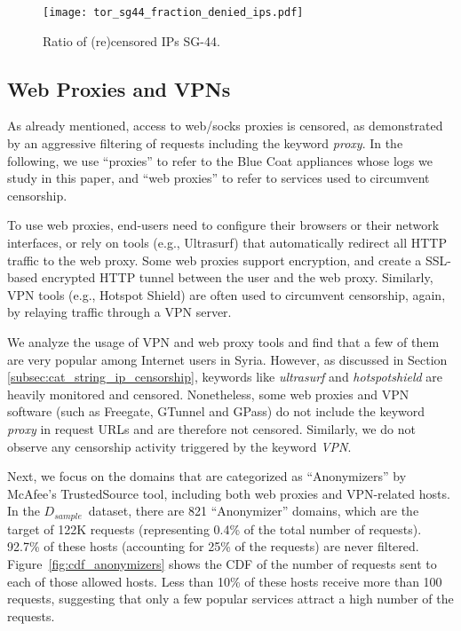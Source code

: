 \documentclass{sig-alternate-2013}
\def\ds{$D_{sample}$\xspace}
\begin{document}
\begin{figure}[t!]
 \begin{center}
 \texttt{[image: tor\_sg44\_fraction\_denied\_ips.pdf]}
\caption{Ratio of (re)censored IPs SG-44.}
\label{fig:tor_sg44_spec}
 \vspace{-0.2cm}
\end{center}
\end{figure}


\subsection{Web Proxies and VPNs}
As already mentioned, access to web/socks proxies is censored, as demonstrated by an aggressive filtering of requests including the keyword {\em proxy}.
In the following, we use ``proxies'' to refer to the Blue Coat appliances whose logs we study in this paper, and ``web proxies'' to refer to services used to circumvent censorship.

To use web proxies, end-users need to configure their browsers or their network interfaces, or rely on tools (e.g., Ultrasurf) that automatically redirect all HTTP traffic to the web proxy. Some web proxies support encryption, and create a SSL-based encrypted HTTP tunnel between the user and the web proxy. Similarly, VPN tools (e.g., Hotspot Shield) are often used to circumvent censorship, again, by relaying traffic through a VPN server. 

We analyze the usage of VPN and web proxy tools and find that 
a few of them are very popular among Internet users in Syria. However, as discussed in Section \ref{subsec:cat_string_ip_censorship}, keywords like {\em ultrasurf} and {\em hotspotshield} are heavily monitored and censored.
Nonetheless, some web proxies and VPN software (such as Freegate, GTunnel and GPass) do not include the keyword {\em proxy} in request URLs  and are therefore not censored. Similarly, we do not observe any censorship activity triggered by the keyword {\em VPN}. 

Next, we focus on the domains that are categorized as ``Anonymizers'' by McAfee's TrustedSource tool,  including both web proxies and VPN-related hosts.
In the \ds\ dataset, there are 821 ``Anonymizer'' domains, which are the target of 122K requests (representing 0.4\% of the total number of requests). 92.7\% of these hosts (accounting for 25\% of the requests) are never filtered. Figure~\ref{fig:cdf_anonymizers} shows the CDF of the number of requests sent to each of those allowed hosts. Less than 10\% of these hosts receive more than 100 requests, suggesting that only a few popular services attract a high number of the requests.      
\end{document}

